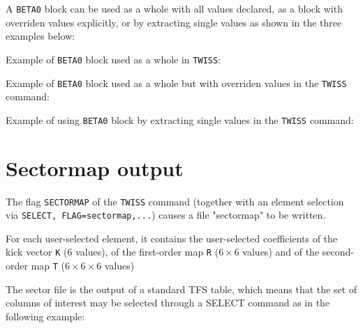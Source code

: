 A \texttt{BETA0} block can be used as a whole with all values declared,
as a block with overriden values explicitly, or by extracting single
values as shown in the three examples below:

Example of \texttt{BETA0} block used as a whole in \texttt{TWISS}: 

Example of \texttt{BETA0} block used as a whole but with overriden
values in the \texttt{TWISS} command:

Example of using \texttt{BETA0} block by extracting single values in the
\texttt{TWISS} command:


%
\section{Sectormap output}
\label{sec:sectormap}

The flag \texttt{SECTORMAP} of the \texttt{TWISS} command (together with an element
selection via \texttt{SELECT, FLAG=sectormap,...}) causes a file "sectormap" to be
written.

For each user-selected element, it contains the user-selected coefficients of 
the kick vector \texttt{K} ($6$ values), of the first-order map \texttt{R} 
($6\times6$ values) and of the second-order map \texttt{T} ($6\times6\times6$ 
values)

The sector file is the output of a standard TFS table, which means that
the set of columns of interest may be selected through a SELECT command
as in the following example:  



